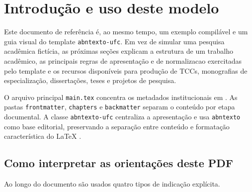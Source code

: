 \section{Introdução e uso deste modelo}\label{sec:introducao}

Este documento de referência é, ao mesmo tempo, um exemplo compilável e um guia visual do \gls{template} \texttt{abntexto-ufc}. Em vez de simular uma pesquisa acadêmica fictícia, as próximas seções explicam a estrutura de um trabalho acadêmico, as principais regras de apresentação e de \gls{normalizacao} exercitadas pelo template e os recursos disponíveis para produção de TCCs, monografias de especialização, dissertações, teses e projetos de pesquisa.

O arquivo principal \texttt{main.tex} concentra os metadados institucionais em \texttt{\string\ufcsetup}. As pastas \texttt{frontmatter}, \texttt{chapters} e \texttt{backmatter} separam o conteúdo por etapa documental. A classe \texttt{abntexto-ufc} centraliza a apresentação e usa \texttt{abntexto} como base editorial, preservando a separação entre conteúdo e formatação característica do \LaTeX{} \parencite{knuth,lamport1994}.

\subsection{Como interpretar as orientações deste PDF}

Ao longo do documento são usados quatro tipos de indicação explícita.





